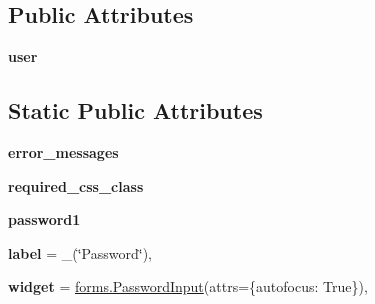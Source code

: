 \subsection*{Public Attributes}
\begin{DoxyCompactItemize}
\item 
\mbox{\label{classdjango_1_1contrib_1_1auth_1_1forms_1_1_admin_password_change_form_af1c53a6d1a3b29df315a395afc445025}} 
{\bfseries user}
\end{DoxyCompactItemize}
\subsection*{Static Public Attributes}
\begin{DoxyCompactItemize}
\item 
\mbox{\label{classdjango_1_1contrib_1_1auth_1_1forms_1_1_admin_password_change_form_a63ad1f41e8f89122b8898349c1419d22}} 
{\bfseries error\+\_\+messages}
\item 
\mbox{\label{classdjango_1_1contrib_1_1auth_1_1forms_1_1_admin_password_change_form_a3626428fa7e3ee183fb951d0b2977ffd}} 
{\bfseries required\+\_\+css\+\_\+class}
\item 
\mbox{\label{classdjango_1_1contrib_1_1auth_1_1forms_1_1_admin_password_change_form_ac285bccd6d9c15fd8a1e37b65c46cc96}} 
{\bfseries password1}
\item 
\mbox{\label{classdjango_1_1contrib_1_1auth_1_1forms_1_1_admin_password_change_form_a2537a3661f6eb2b35682d54a94023c5a}} 
{\bfseries label} = \+\_\+(\char`\"{}Password\char`\"{}),
\item 
\mbox{\label{classdjango_1_1contrib_1_1auth_1_1forms_1_1_admin_password_change_form_a114cbc5350e0bac9b2334123d1b5d565}} 
{\bfseries widget} = \mbox{\hyperlink{classdjango_1_1forms_1_1widgets_1_1_password_input}{forms.\+Password\+Input}}(attrs=\{\textquotesingle{}autofocus\textquotesingle{}\+: True\}),

\end{DoxyCompactItemize}
